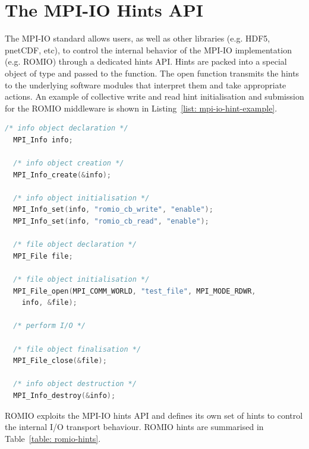 \section{The MPI-IO Hints API}
\label{mpi-io-hints}
The MPI-IO standard allows users, as well as other libraries (e.g. HDF5, pnetCDF, etc), to control the internal behavior of the MPI-IO implementation (e.g. ROMIO) through a dedicated hints API. Hints are packed into a special object of type  and passed to the  function. The open function transmits the hints to the underlying software modules that interpret them and take appropriate actions. An example of collective write and read hint initialisation and submission for the ROMIO middleware is shown in Listing~\ref{list: mpi-io-hint-example}.

\begin{lstlisting}[language=C, caption=MPI-IO Hints Initialisation and Submission, label={list: mpi-io-hint-example}]
  /* info object declaration */
  MPI_Info info;

  /* info object creation */
  MPI_Info_create(&info);

  /* info object initialisation */
  MPI_Info_set(info, "romio_cb_write", "enable");
  MPI_Info_set(info, "romio_cb_read", "enable");

  /* file object declaration */
  MPI_File file;

  /* file object initialisation */
  MPI_File_open(MPI_COMM_WORLD, "test_file", MPI_MODE_RDWR, 
    info, &file);

  /* perform I/O */

  /* file object finalisation */
  MPI_File_close(&file);

  /* info object destruction */
  MPI_Info_destroy(&info);
\end{lstlisting}

ROMIO exploits the MPI-IO hints API and defines its own set of hints to control the internal I/O transport behaviour. ROMIO hints are summarised in Table~\ref{table: romio-hints}. 

